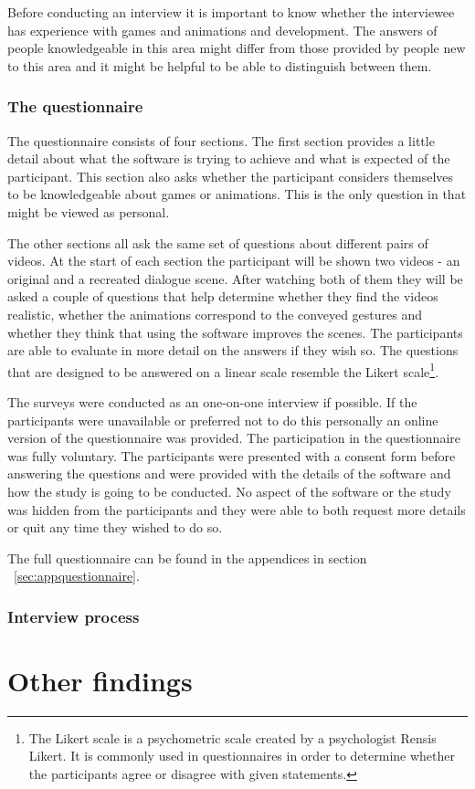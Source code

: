Before conducting an interview it is important to know whether the interviewee has experience with games and animations and development. The answers of people knowledgeable in this area might differ from those provided by people new to this area and it might be helpful to be able to distinguish between them.

\medskip
\subsubsection{The questionnaire}
The questionnaire consists of four sections. The first section provides a little detail about what the software is trying to achieve and what is expected of the participant. This section also asks whether the participant considers themselves to be knowledgeable about games or animations. This is the only question in that might be viewed as personal.

The other sections all ask the same set of questions about different pairs of videos. At the start of each section the participant will be shown two videos - an original and a recreated dialogue scene. After watching both of them they will be asked a couple of questions that help determine whether they find the videos realistic, whether the animations correspond to the conveyed gestures and whether they think that using the software improves the scenes. The participants are able to evaluate in more detail on the answers if they wish so. The questions that are designed to be answered on a linear scale resemble the Likert scale\footnote{The Likert scale is a psychometric scale created by a psychologist Rensis Likert. It is commonly used in questionnaires in order to determine whether the participants agree or disagree with given statements.}.

The surveys were conducted as an one-on-one interview if possible. If the participants were unavailable or preferred not to do this personally an online version of the questionnaire was provided. The participation in the questionnaire was fully voluntary. The participants were presented with a consent form before answering the questions and were provided with the details of the software and how the study is going to be conducted. No aspect of the software or the study was hidden from the participants and they were able to both request more details or quit any time they wished to do so.

The full questionnaire can be found in the appendices in section ~\ref{sec:appquestionnaire}.




\medskip
\subsubsection{Interview process}


\section{Other findings \label{sec:evalotherfindings}}
